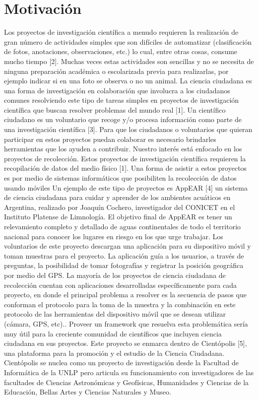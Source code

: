 \section{ Motivación }

Los proyectos de investigación científica a menudo requieren la realización de gran número de actividades simples que son difíciles de automatizar (clasificación de fotos, anotaciones, observaciones, etc.) lo cual, entre otras cosas, consume mucho tiempo [2]. Muchas veces estas actividades son sencillas y no se necesita de ninguna preparación académica o escolarizada previa para realizarlas, por ejemplo indicar si en una foto se observa o no un animal. La ciencia ciudadana es una forma de investigación en colaboración que involucra a los ciudadanos comunes resolviendo este tipo de tareas simples en proyectos de investigación científica que buscan resolver problemas del mundo real [1]. Un científico ciudadano es un voluntario que recoge y/o procesa información como parte de una investigación científica [3]. Para que los ciudadanos o voluntarios que quieran participar en estos proyectos puedan colaborar es necesario brindarles herramientas que los ayuden a contribuir. 
Nuestro interés está enfocado en los proyectos de recolección. Estos proyectos de investigación científica requieren la recopilación de datos del medio físico [1]. Una forma de asistir a estos proyectos es por medio de sistemas informáticos que posibiliten la recolección de datos usando móviles
Un ejemplo de este tipo de proyectos es AppEAR [4] un sistema de ciencia ciudadana para cuidar y aprender de los ambientes acuáticos en Argentina, realizado por Joaquín Cochero, investigador del CONICET en el Instituto Platense de Limnología. El objetivo final de AppEAR es tener un relevamiento completo y detallado de aguas continentales de todo el territorio nacional para conocer los lugares en riesgo en los que urge trabajar. Los voluntarios de este proyecto descargan una aplicación para su dispositivo móvil y toman muestras para el proyecto. La aplicación guía a los usuarios, a través de preguntas, la posibilidad de tomar fotografías y registrar la posición geográfica por medio del GPS.
La mayoría de los proyectos de ciencia ciudadana de recolección cuentan con aplicaciones desarrolladas específicamente para cada proyecto, en donde el principal problema a resolver es la secuencia de pasos que conforman el protocolo para la toma de la muestra y la combinación en este protocolo de las herramientas del dispositivo móvil que se desean utilizar (cámara, GPS, etc).. Proveer un framework que resuelva esta problemática  sería muy útil para la creciente comunidad de científicos que incluyen ciencia ciudadana en sus proyectos.
Este proyecto se enmarca dentro de Cientópolis [5], una plataforma para la promoción y el estudio de la Ciencia Ciudadana. Cientópolis se nuclea como un proyecto de investigación desde la Facultad de Informática de la UNLP pero articula su funcionamiento con investigadores de las facultades de Ciencias Astronómicas y Geofísicas, Humanidades y Ciencias de la Educación, Bellas Artes y Ciencias Naturales y Museo.

